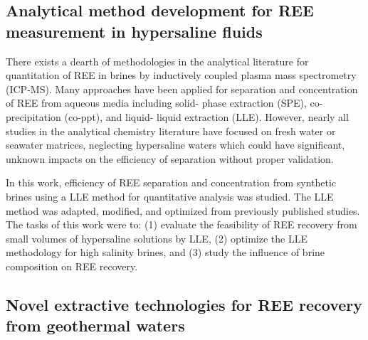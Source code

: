 \subsection{Analytical method development for REE measurement in hypersaline fluids}

There exists a dearth of methodologies in the analytical literature for quantitation of REE in brines by inductively coupled plasma mass spectrometry (ICP-MS).
Many approaches have been applied for separation and concentration of REE from aqueous media including solid- phase extraction (SPE), co-precipitation (co-ppt), and liquid- liquid extraction (LLE).
However, nearly all studies in the analytical chemistry literature have focused on fresh water or seawater matrices, neglecting hypersaline waters which could have significant, unknown impacts on the efficiency of separation without proper validation.

In this work, efficiency of REE separation and concentration from synthetic brines using a LLE method for quantitative analysis was studied.
The LLE method was adapted, modified, and optimized from previously published studies.
The tasks of this work were to: (1) evaluate the feasibility of REE recovery from small volumes of hypersaline solutions by LLE, (2) optimize the LLE methodology for high salinity brines, and (3) study the influence of brine composition on REE recovery.

\subsection{Novel extractive technologies for REE recovery from geothermal waters}



